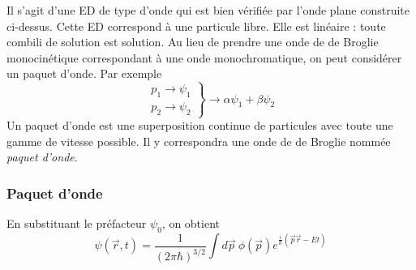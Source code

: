 		Il s'agit d'une ED de type d'onde qui est bien vérifiée par l'onde plane construite ci-dessus. 
		Cette ED correspond à une particule libre. Elle est linéaire : toute combili de solution est 
		solution. Au lieu de prendre une onde de de Broglie monocinétique correspondant à une onde 
		monochromatique, on peut considérer un paquet d'onde. Par exemple
		\begin{equation}
		\left.\begin{array}{ll}
		p_1 \rightarrow \psi_1\\
		p_2 \rightarrow \psi_2
		\end{array}\right\}\longrightarrow \alpha\psi_1+\beta\psi_2
		\end{equation}
		Un paquet d'onde est une superposition continue de particules avec toute une gamme de vitesse 
		possible. Il y correspondra une onde de de Broglie nommée \textit{paquet d'onde}.

		\subsubsection{Paquet d'onde}
		En substituant le préfacteur $\psi_0$, on obtient
		\begin{equation}
		\psi(\vec{r},t) = \dfrac{1}{(2\pi\hbar)^{3/2}}\int d\vec{p}\ \phi(\vec{p})e^{\frac{i}{\hbar}(\vec{p}
		\vec{r}-Et)}
		\end{equation}
		
